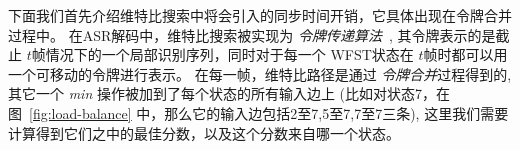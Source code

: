 下面我们首先介绍维特比搜索中将会引入的同步时间开销，它具体出现在令牌合并过程中。
%
%
在ASR解码中，维特比搜索被实现为 \textit{令牌传递算法}~\cite{woodland19951994}, 其令牌表示的是截止 $t$帧情况下的一个局部识别序列，同时对于每一个 WFST状态在 $t$帧时都可以用一个可移动的令牌进行表示。
在每一帧，维特比路径是通过 \textit{令牌合并}过程得到的, 其它一个 \textit{min} 操作被加到了每个状态的所有输入边上 (比如对状态7，在图~\ref{fig:load-balance} 中，那么它的输入边包括2至7,5至7,7至7三条), 这里我们需要计算得到它们之中的最佳分数，以及这个分数来自哪一个状态。

%


